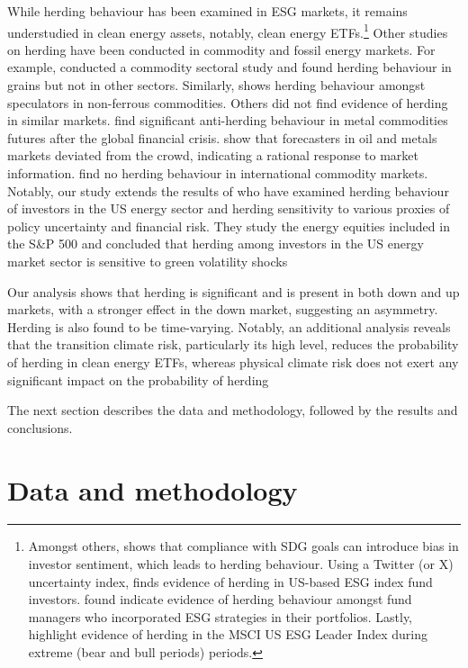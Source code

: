 \documentclass[
  letterpaper,
  DIV=11,
  numbers=noendperiod]{scrartcl}
\begin{document}
While herding behaviour has been examined in ESG markets, it remains
understudied in clean energy assets, notably, clean energy
ETFs.\footnote{Amongst others, \citet{loang2023} shows that compliance
  with SDG goals can introduce bias in investor sentiment, which leads
  to herding behaviour. Using a Twitter (or X) uncertainty index,
  \citet{koutmos2024} finds evidence of herding in US-based ESG index
  fund investors. \citet{przychodzen2016} found indicate evidence of
  herding behaviour amongst fund managers who incorporated ESG
  strategies in their portfolios. Lastly, \citet{rubbaniy2021} highlight
  evidence of herding in the MSCI US ESG Leader Index during extreme
  (bear and bull periods) periods.} Other studies on herding have been
conducted in commodity and fossil energy markets. For example,
\citet{demirer2013} conducted a commodity sectoral study and found
herding behaviour in grains but not in other sectors. Similarly,
\citet{gilbert2010} shows herding behaviour amongst speculators in
non-ferrous commodities. Others did not find evidence of herding in
similar markets. \citet{babalos2015} find significant anti-herding
behaviour in metal commodities futures after the global financial
crisis. \citet{pierdzioch2010} show that forecasters in oil and metals
markets deviated from the crowd, indicating a rational response to
market information. \citet{steen2013} find no herding behaviour in
international commodity markets. Notably, our study extends the results
of \citet{dragomirescu-gaina2021} who have examined herding behaviour of
investors in the US energy sector and herding sensitivity to various
proxies of policy uncertainty and financial risk. They study the energy
equities included in the S\&P 500 and concluded that herding among
investors in the US energy market sector is sensitive to green
volatility shocks

Our analysis shows that herding is significant and is present in both
down and up markets, with a stronger effect in the down market,
suggesting an asymmetry. Herding is also found to be time-varying.
Notably, an additional analysis reveals that the transition climate
risk, particularly its high level, reduces the probability of herding in
clean energy ETFs, whereas physical climate risk does not exert any
significant impact on the probability of herding

The next section describes the data and methodology, followed by the
results and conclusions.

\section{Data and methodology}\label{data-and-methodology}
\end{document}

